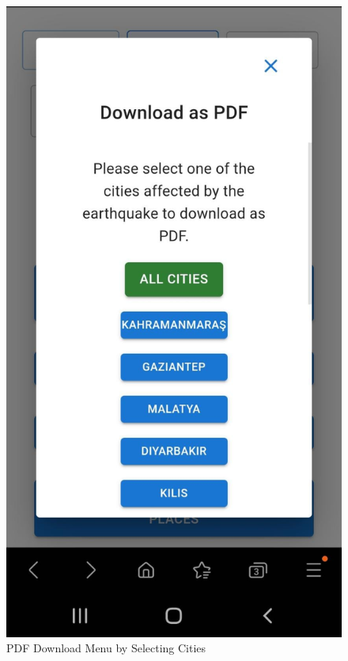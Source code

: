 \begin{figure}[H]
    \begin{center}
        \includegraphics[scale = 0.15]{assets/pdf.jpeg}
        \caption[PDF Download Menu]{PDF Download Menu by Selecting Cities}
    \end{center}
\end{figure}

